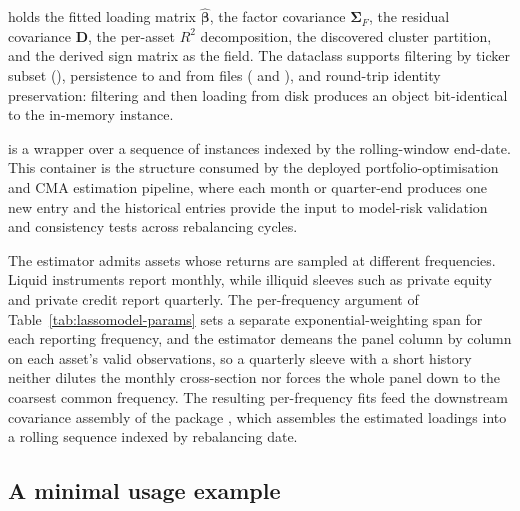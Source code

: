 \documentclass[article]{jss}
\begin{document}
 holds the fitted loading matrix
$\hat{\bm{\beta}}$, the factor covariance $\bm{\Sigma}_F$, the residual
covariance $\bm{D}$, the per-asset $R^2$ decomposition, the discovered
cluster partition, and the derived sign matrix as the
 field. The dataclass supports filtering by
ticker subset (), persistence to and from
 files ( and ), and round-trip
identity preservation: filtering and then loading from disk produces
an object bit-identical to the in-memory instance.


 is a wrapper over a sequence of
 instances indexed by the rolling-window
end-date. This container is the structure consumed by the deployed
portfolio-optimisation and CMA estimation pipeline, where each month or
quarter-end produces one new entry and the historical entries provide
the input to model-risk validation and consistency tests across
rebalancing cycles.

The estimator admits assets whose returns are sampled at different
frequencies. Liquid instruments report monthly, while illiquid sleeves
such as private equity and private credit report quarterly. The
per-frequency  argument of
Table~\ref{tab:lassomodel-params} sets a separate exponential-weighting
span for each reporting frequency, and the estimator demeans the panel
column by column on each asset's valid observations, so a quarterly
sleeve with a short history neither dilutes the monthly cross-section
nor forces the whole panel down to the coarsest common frequency. The
resulting per-frequency fits feed the downstream covariance assembly of
the  package \citep{sepp2024optimalportfolios},
which assembles the estimated loadings into a rolling sequence indexed
by rebalancing date.



\subsection[A minimal usage example]{A minimal usage example} \label{sec:usage-example}
\end{document}
